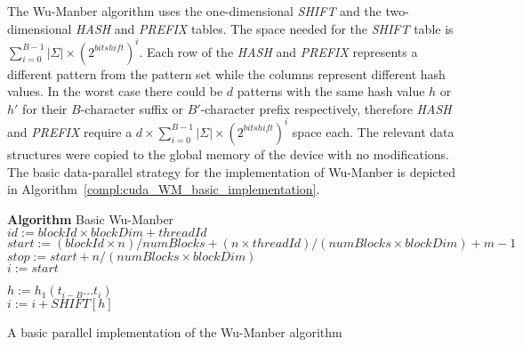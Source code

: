 \documentclass{ws-ijait}
\begin{document}
The Wu-Manber algorithm uses the one-dimensional \textit{SHIFT} and the two-dimensional \textit{HASH} and \textit{PREFIX} tables. The space needed for the \textit{SHIFT} table is $\displaystyle\sum\limits_{i=0}^{B-1} |\Sigma| \times (2 ^ {bitshift})^i$. Each row of the \textit{HASH} and \textit{PREFIX} represents a different pattern from the pattern set while the columns represent different hash values. In the worst case there could be $d$ patterns with the same hash value $h$ or $h'$ for their $B$-character suffix or $B'$-character prefix respectively, therefore \textit{HASH} and \textit{PREFIX} require a $d \times \displaystyle\sum\limits_{i=0}^{B-1} |\Sigma| \times (2 ^ {bitshift})^i$ space each. The relevant data structures were copied to the global memory of the device with no modifications. The basic data-parallel strategy for the implementation of Wu-Manber is depicted in Algorithm~\ref{compl:cuda_WM_basic_implementation}.\\

\begin{algorithm}[h]

\textbf{Algorithm} Basic Wu-Manber\\

$id := blockId \times blockDim + threadId$\\
$start := ( blockId \times n ) / numBlocks + ( n \times threadId ) / ( numBlocks \times blockDim ) + m - 1$\\
$stop := start + n / ( numBlocks \times blockDim )$\\


$i := start$\\

 {

	$h := h_1(t_{i - B}\ldots t_i)$\\
	
	 {
		$i := i + SHIFT[h]$\\
	}
}

\caption{A basic parallel implementation of the Wu-Manber algorithm}
\label{compl:cuda_WM_basic_implementation}
\end{algorithm}
\end{document}
